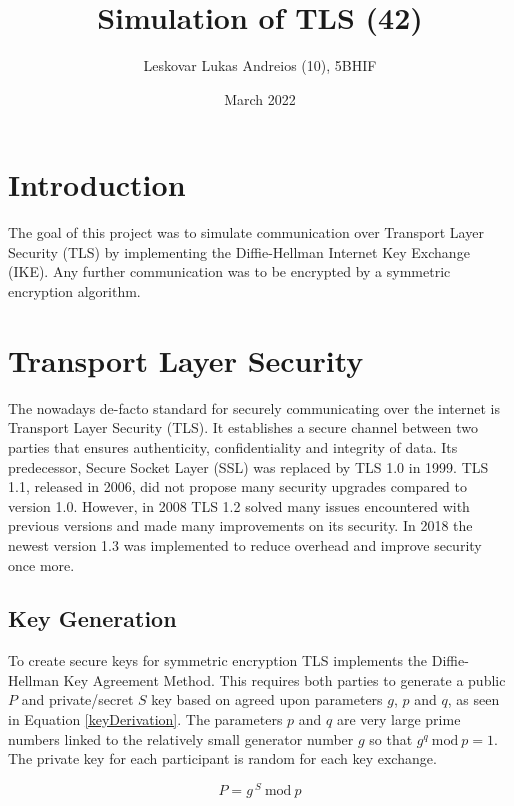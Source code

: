 \documentclass[12pt, letterpaper]{article}
\title{Simulation of TLS (42)}
\author{Leskovar Lukas Andreios (10), 5BHIF}
\date{March 2022}
\begin{document}
\begin{titlepage}
	\clearpage
	\maketitle
	\thispagestyle{empty}
\end{titlepage}

\tableofcontents
\newpage

\section{Introduction}
The goal of this project was to simulate communication over Transport Layer Security (TLS) by implementing the Diffie-Hellman Internet Key Exchange (IKE). Any further communication was to be encrypted by a symmetric encryption algorithm.

\section{Transport Layer Security}
The nowadays de-facto standard for securely communicating over the internet is Transport Layer Security (TLS). It establishes a secure channel between two parties that ensures authenticity, confidentiality and integrity of data.
Its predecessor, Secure Socket Layer (SSL) was replaced by TLS 1.0 in 1999. 
TLS 1.1, released in 2006, did not propose many security upgrades compared to version 1.0. However, in 2008 TLS 1.2 solved many issues encountered with previous versions and made many improvements on its security.
In 2018 the newest version 1.3 was implemented to reduce overhead and improve security once more. \cite{cloudflareTLS}

\subsection{Key Generation}
To create secure keys for symmetric encryption TLS implements the Diffie-Hellman Key Agreement Method. This requires both parties to generate a public $P$ and private/secret $S$ key based on agreed upon parameters $g$, $p$ and $q$, as seen in Equation \ref{keyDerivation}. The parameters $p$ and $q$ are very large prime numbers linked to the relatively small generator number $g$ so that $g^{q}\ \mathrm{mod}\ p = 1$. The private key for each participant is random for each key exchange. \cite{dierks1999rfc2246}

\begin{equation}\label{keyDerivation}
	P = g^{ \ S}\ \mathrm{mod}\ p
\end{equation}
\end{document}

